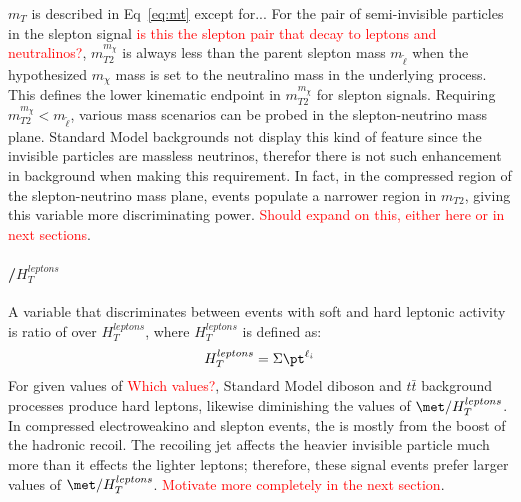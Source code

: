 $m_T$ is described in Eq~\ref{eq:mt} except for... For the pair of semi-invisible particles in the slepton signal \textcolor{red}{is this the slepton pair that decay to leptons and neutralinos?}, $m^{m_\chi}_{T2}$ is always less than the parent slepton mass $m_{\tilde\ell}$ when the hypothesized $m_\chi$ mass is set to the neutralino mass in the underlying process.  This defines the lower kinematic endpoint in $m^{m_\chi}_{T2}$ for slepton signals.  Requiring $m^{m_\chi}_{T2} < m_{\tilde\ell}$, various mass scenarios can be probed in the slepton-neutrino mass plane.  Standard Model backgrounds not display this kind of feature since the invisible particles are massless neutrinos, therefor there is not such enhancement in background when making this requirement.  In fact, in the compressed region of the slepton-neutrino mass  plane, events populate a narrower region in $m_{T2}$, giving this variable more discriminating power.  \textcolor{red}{Should expand on this, either here or in next sections}.

\paragraph{\met/$H_T^{leptons}$}
A variable that discriminates between events with soft and hard leptonic activity is ratio of \met over $H_T^{leptons}$, where $H_T^{leptons}$ is defined as:
\begin{equation}
H_T^{leptons} = \Sigma\pt^{\ell_i}
\end{equation}
 For given values of \met \textcolor{red}{Which values?}, Standard Model diboson and $t\bar{t}$ background processes produce hard leptons, likewise diminishing the values of $\met/H_T^{leptons}$.  In compressed electroweakino and slepton events, the \met{} is mostly from the boost of the hadronic recoil.  The recoiling jet affects the heavier invisible particle much more than it effects the lighter leptons; therefore, these signal events prefer larger values of $\met/H_T^{leptons}$. \textcolor{red}{Motivate more completely in the next section}.  
 
